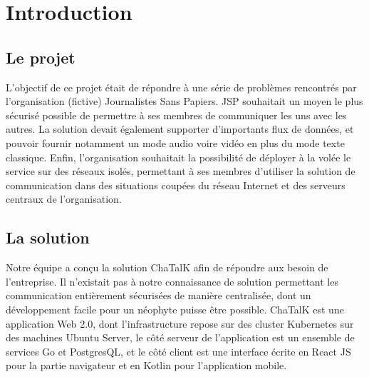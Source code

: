 \chapter{Introduction}


\section{Le projet}

L'objectif de ce projet était de répondre à une série de problèmes rencontrés par l'organisation (fictive) Journalistes Sans Papiers.
JSP souhaitait un moyen le plus sécurisé possible de permettre à ses membres de communiquer les uns avec les autres.
La solution devait également supporter d'importants flux de données, et pouvoir fournir notamment un mode audio voire vidéo en plus du mode texte classique.
Enfin, l'organisation souhaitait la possibilité de déployer à la volée le service sur des réseaux isolés, permettant à ses membres d'utiliser la solution de communication dans des situations coupées du réseau Internet et des serveurs centraux de l'organisation.

\section{La solution}

Notre équipe a conçu la solution ChaTalK afin de répondre aux besoin de l'entreprise.
Il n'existait pas à notre connaissance de solution permettant les communication entièrement sécurisées de manière centralisée, dont un développement facile pour un néophyte puisse être possible.
ChaTalK est une application Web 2.0, dont l'infrastructure repose sur des cluster Kubernetes sur des machines Ubuntu Server, le côté serveur de l'application est un ensemble de services Go et PostgresQL, et le côté client est une interface écrite en React JS pour la partie navigateur et en Kotlin pour l'application mobile.
